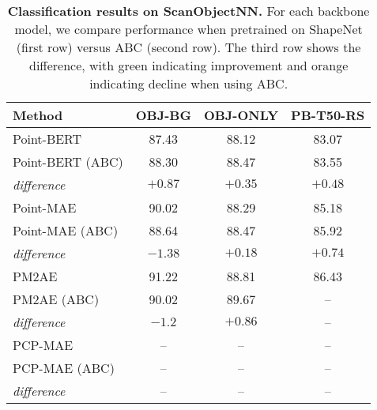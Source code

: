 \begin{table}
\begin{center}
\begin{tabular}{l|ccc}
    
\toprule
Method & OBJ-BG & OBJ-ONLY & PB-T50-RS \\
\midrule

Point-BERT~\cite{pbert} & 87.43 & 88.12 & 83.07\\
Point-BERT (ABC) & 88.30 & 88.47 & 83.55 \\
\textit{difference} & \cellcolor{green!25}$+0.87$ & \cellcolor{green!25}$+0.35$ & \cellcolor{green!25}$+0.48$ \\
\midrule
Point-MAE~\cite{pmae} & 90.02 & 88.29 & 85.18 \\
Point-MAE (ABC) & 88.64 & 88.47 & 85.92 \\
\textit{difference} & \cellcolor{orange!25}$-1.38$ & \cellcolor{green!25}$+0.18$ & \cellcolor{green!25}$+0.74$ \\
\midrule
PM2AE~\cite{pm2ae} & 91.22 & 88.81 & 86.43 \\
PM2AE (ABC) & 90.02 & 89.67 & -- \\
\textit{difference} & \cellcolor{orange!25}$-1.2$ & \cellcolor{green!25}$+0.86$ & -- \\
\midrule
PCP-MAE~\cite{pcpmae} & -- & -- & -- \\
PCP-MAE (ABC) & -- & -- & -- \\
\textit{difference} & -- & -- & -- \\

\bottomrule
\end{tabular}
\caption{{\bf Classification results on ScanObjectNN.} For each backbone model, we compare performance when pretrained on ShapeNet (first row) versus ABC (second row). The third row shows the difference, with green indicating improvement and orange indicating decline when using ABC.}
\setlength\tabcolsep{2pt}
\label{tb:scanobject}
\end{center}

\end{table}